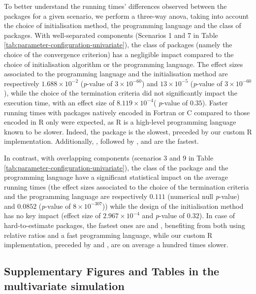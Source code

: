 To better understand the running times' differences observed between the
packages for a given scenario, we perform a three-way anova, taking into
account the choice of initialisation method, the programming language
and the class of packages. With well-separated components (Scenarios 1
and 7 in Table \ref{tab:parameter-configuration-univariate}), the class
of packages (namely the choice of the convergence criterion) has a negligible
impact compared to the choice of initialisation algorithm or the programming
language. The effect sizes associated to the programming language and
the initialisation method are respectively \(1.688 \times 10^{-2}\)
(\emph{p}-value of \(3 \times 10^{-60}\)) and \(13 \times 10^{-5}\) (\emph{p}-value of
\(3 \times 10^{-60}\)), while the choice of the termination criteria did
not significantly impact the execution time, with an effect size of
\(8.119 \times 10^{-4}\)( \emph{p}-value of \(0.35\)). Faster running times with
packages natively encoded in Fortran or C compared to those encoded in R
only were expected, as R is a high-level programming language known to
be slower. Indeed, the  package is the slowest, preceded by
our custom R implementation. Additionally,
, followed by ,  and 
are the fastest.

In contrast, with overlapping components (scenarios 3 and 9 in Table
\ref{tab:parameter-configuration-univariate}), the class of the
package and the programming language have a significant statistical impact on the average running
times (the effect sizes associated to the
choice of the termination criteria and the programming language are
respectively \(0.111\) (numerical null \emph{p}-value) and \(0.0852\) (\emph{p}-value of
\(8 \times 10^{-307}\))) while the design of the initialisation method has no key impact (effect size of
\(2.967 \times 10^{-4}\) and \emph{p}-value of \(0.32\)). In case of hard-to-estimate packages, the fastest ones are  and , benefiting from both using
relative ratios and a fast programming language, while our
custom R implementation, preceded by  and ,
are on average a hundred times slower.

\newpage

\hypertarget{supplementary-figures-and-tables-in-the-multivariate-simulation}{%
\subsection{Supplementary Figures and Tables in the multivariate simulation}\label{supplementary-figures-and-tables-in-the-multivariate-simulation}}

